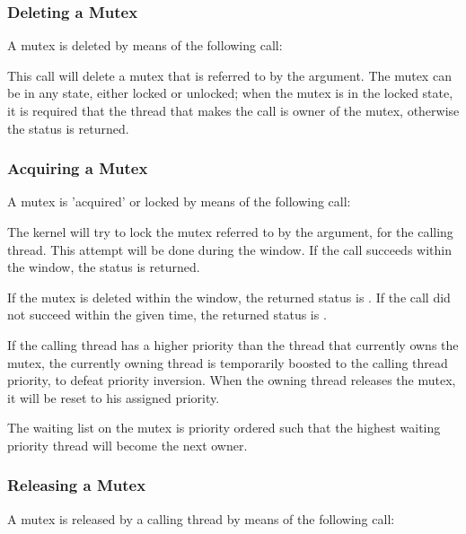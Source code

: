 \subsubsection{Deleting a Mutex}

A mutex is deleted by means of the following call:


This call will delete a mutex that is referred to by the  argument.
The mutex can be in any state, either locked or unlocked; when the mutex is
in the locked state, it is required that the thread that makes the call is
owner of the mutex, otherwise the  status is
returned.

\subsubsection{Acquiring a Mutex}

A mutex is 'acquired' or locked by means of the following call:


The kernel will try to lock the mutex referred to by the  argument,
for the calling thread. This attempt will be done during the 
window. If the call succeeds within the  window, the
 status is returned. 

If the mutex is deleted within the  window, the returned status is
. If the call did not succeed within the given time, the
returned status is .

If the calling thread has a higher priority than the thread that currently
owns the mutex, the currently owning thread is temporarily boosted to the
calling thread priority, to defeat priority inversion. When the owning
thread releases the mutex, it will be reset to his assigned priority.

The waiting list on the mutex is priority ordered such that the highest
waiting priority thread will become the next owner.

\subsubsection{Releasing a Mutex}

A mutex is released by a calling thread by means of the following call:


